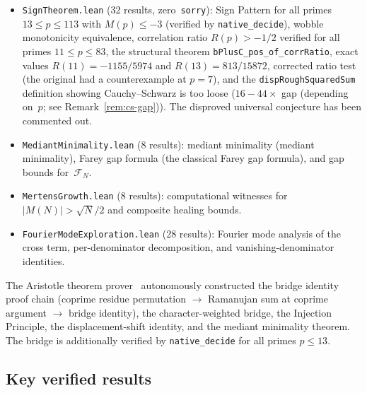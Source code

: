 \documentclass[11pt]{article}
\theoremstyle{definition}
\newcommand{\F}{\mathcal{F}}
\begin{document}
\begin{itemize}
  \item \texttt{SignTheorem.lean} (32 results,
    zero~\texttt{sorry}): Sign Pattern for all primes
    $13 \le p \le 113$ with $M(p) \le -3$ (verified by \texttt{native\_decide}), wobble
    monotonicity equivalence, correlation ratio $R(p) > -1/2$
    verified for all primes $11 \le p \le 83$,
    the structural theorem \texttt{bPlusC\_pos\_of\_corrRatio},
    exact values $R(11) = -1155/5974$ and $R(13) = 813/15872$,
    corrected ratio test (the original had a counterexample at $p = 7$),
    and the \texttt{dispRoughSquaredSum} definition showing
    Cauchy--Schwarz is too loose ($16{-}44\times$ gap (depending on~$p$; see Remark~\ref{rem:cs-gap})).
    The disproved universal conjecture has been commented out.
  \item \texttt{MediantMinimality.lean} (8 results):
    mediant minimality (mediant minimality),
    Farey gap formula (the classical Farey gap formula),
    and gap bounds for~$\F_N$.
  \item \texttt{MertensGrowth.lean} (8 results):
    computational witnesses for $|M(N)| > \sqrt{N}/2$
    and composite healing bounds.
  \item \texttt{FourierModeExploration.lean} (28 results):
    Fourier mode analysis of the cross term, per-denominator
    decomposition, and vanishing-denominator identities.
\end{itemize}
The Aristotle theorem prover~\cite{Aristotle2025}
autonomously constructed the bridge identity proof chain
(coprime residue permutation $\to$ Ramanujan sum at coprime
argument $\to$ bridge identity), the character-weighted
bridge, the Injection Principle, the displacement-shift
identity, and the mediant minimality theorem.
The bridge is additionally verified by
\texttt{native\_decide} for all primes $p \le 13$.

\subsection{Key verified results}
\end{document}
